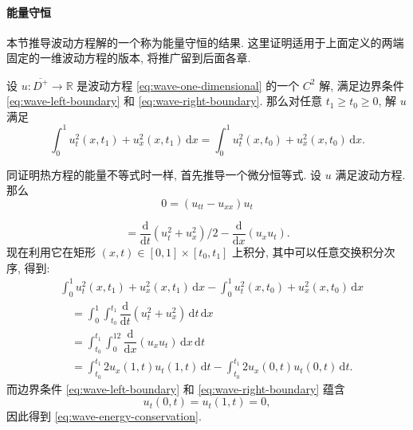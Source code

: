 \paragraph*{能量守恒}

本节推导波动方程解的一个称为能量守恒的结果. 这里证明适用于上面定义的两端固定的一维波动方程的版本, 将推广留到后面各章.

\begin{Lemma}
\label{lem:wave-energy-conservation}
设 $u:\overline{D^+}\to\mathbb{R}$ 是波动方程 \eqref{eq:wave-one-dimensional} 的一个 $C^2$ 解, 满足边界条件 \eqref{eq:wave-left-boundary} 和 \eqref{eq:wave-right-boundary}. 那么对任意 $t_1\geq t_0\geq0$, 解 $u$ 满足
\begin{equation}\label{eq:wave-energy-conservation}
\int_0^1u_t^2(x,t_1)+u_x^2(x,t_1)\,\mathrm{d}x=\int_0^1u_t^2(x,t_0)+u_x^2(x,t_0)\,\mathrm{d}x.
\end{equation}

\end{Lemma}

\begin{Proof}
同证明热方程的能量不等式时一样, 首先推导一个微分恒等式. 设 $u$ 满足波动方程. 那么
\begin{equation}\label{eq:wave-equation-tested-by-velocity}
0=(u_{tt}-u_{xx})u_t
\end{equation}

\begin{equation}\label{eq:wave-local-energy-identity}
{}=\dfrac{\mathrm{d}}{\mathrm{d}t}(u_t^2+u_x^2)/2-\dfrac{\mathrm{d}}{\mathrm{d}x}(u_xu_t).
\end{equation}
现在利用它在矩形 $(x,t)\in[0,1]\times[t_0,t_1]$ 上积分, 其中可以任意交换积分次序, 得到:
\[
\begin{aligned}
&\int_0^1u_t^2(x,t_1)+u_x^2(x,t_1)\,\mathrm{d}x
-\int_0^1u_t^2(x,t_0)+u_x^2(x,t_0)\,\mathrm{d}x\\
&\quad=\int_0^1\int_{t_0}^{t_1}\dfrac{\mathrm{d}}{\mathrm{d}t}(u_t^2+u_x^2)\,\mathrm{d}t\,\mathrm{d}x\\
&\quad=\int_{t_0}^{t_1}\int_0^12\dfrac{\mathrm{d}}{\mathrm{d}x}(u_xu_t)\,\mathrm{d}x\,\mathrm{d}t\\
&\quad=\int_{t_0}^{t_1}2u_x(1,t)u_t(1,t)\,\mathrm{d}t-\int_{t_0}^{t_1}2u_x(0,t)u_t(0,t)\,\mathrm{d}t.
\end{aligned}
\]
而边界条件 \eqref{eq:wave-left-boundary} 和 \eqref{eq:wave-right-boundary} 蕴含
\begin{equation}\label{eq:wave-boundary-time-derivatives}
u_t(0,t)=u_t(1,t)=0,
\end{equation}
因此得到 \eqref{eq:wave-energy-conservation}.
\end{Proof}

